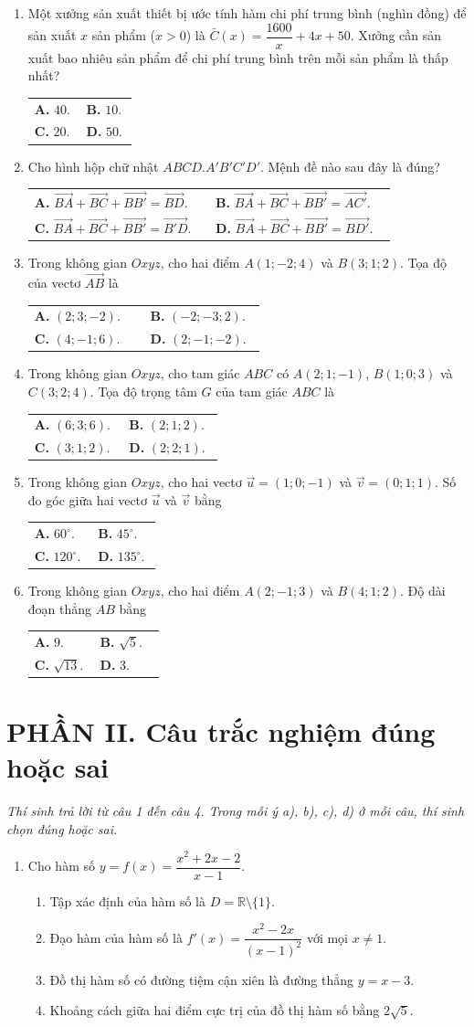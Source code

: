 \documentclass[12pt,a4paper]{article}
\makeatletter
\newcommand{\bonpa}[4]{\par\nobreak\smallskip\nobreak\noindent
\begin{tabular}{@{}p{0.47\linewidth}p{0.47\linewidth}@{}}
\textbf{A.} #1 & \textbf{B.} #2\\[8pt]
\textbf{C.} #3 & \textbf{D.} #4\end{tabular}}
\makeatother
\begin{document}
\newpage
\begin{enumerate}[start=7]
\item Một xưởng sản xuất thiết bị ước tính hàm chi phí trung bình (nghìn đồng) để sản xuất $x$ sản phẩm ($x>0$) là $\bar{C}(x)=\dfrac{1600}{x}+4x+50$. Xưởng cần sản xuất bao nhiêu sản phẩm để chi phí trung bình trên mỗi sản phẩm là thấp nhất?
\bonpa{$40$.}{$10$.}{$20$.}{$50$.}

\item Cho hình hộp chữ nhật $ABCD.A'B'C'D'$. Mệnh đề nào sau đây là đúng?
\bonpa{$\vec{BA}+\vec{BC}+\vec{BB'}=\vec{BD}$.}{$\vec{BA}+\vec{BC}+\vec{BB'}=\vec{AC'}$.}{$\vec{BA}+\vec{BC}+\vec{BB'}=\vec{B'D}$.}{$\vec{BA}+\vec{BC}+\vec{BB'}=\vec{BD'}$.}

\item Trong không gian $Oxyz$, cho hai điểm $A(1;-2;4)$ và $B(3;1;2)$. Tọa độ của vectơ $\vec{AB}$ là
\bonpa{$(2;3;-2)$.}{$(-2;-3;2)$.}{$(4;-1;6)$.}{$(2;-1;-2)$.}

\item Trong không gian $Oxyz$, cho tam giác $ABC$ có $A(2;1;-1)$, $B(1;0;3)$ và $C(3;2;4)$. Tọa độ trọng tâm $G$ của tam giác $ABC$ là
\bonpa{$(6;3;6)$.}{$(2;1;2)$.}{$(3;1;2)$.}{$(2;2;1)$.}

\item Trong không gian $Oxyz$, cho hai vectơ $\vec{u}=(1;0;-1)$ và $\vec{v}=(0;1;1)$. Số đo góc giữa hai vectơ $\vec{u}$ và $\vec{v}$ bằng
\bonpa{$60^\circ$.}{$45^\circ$.}{$120^\circ$.}{$135^\circ$.}

\item Trong không gian $Oxyz$, cho hai điểm $A(2;-1;3)$ và $B(4;1;2)$. Độ dài đoạn thẳng $AB$ bằng
\bonpa{$9$.}{$\sqrt{5}$.}{$\sqrt{13}$.}{$3$.}
\end{enumerate}

\vspace{3pt}
\section*{\large PHẦN II. Câu trắc nghiệm đúng hoặc sai}
\textit{Thí sinh trả lời từ câu 1 đến câu 4. Trong mỗi ý a), b), c), d) ở mỗi câu, thí sinh chọn đúng hoặc sai.}
\begin{enumerate}
\item Cho hàm số $y=f(x)=\dfrac{x^2+2x-2}{x-1}$.
\begin{enumerate}
\item Tập xác định của hàm số là $D=\mathbb{R}\setminus\{1\}$.
\item Đạo hàm của hàm số là $f'(x)=\dfrac{x^2-2x}{(x-1)^2}$ với mọi $x\ne 1$.
\item Đồ thị hàm số có đường tiệm cận xiên là đường thẳng $y=x-3$.
\item Khoảng cách giữa hai điểm cực trị của đồ thị hàm số bằng $2\sqrt{5}$.
\end{enumerate}
\end{enumerate}
\end{document}
